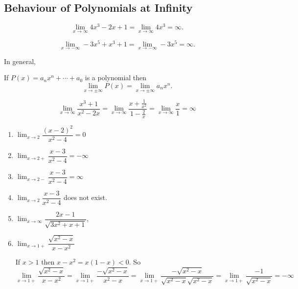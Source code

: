 \documentclass[../main.tex]{subfiles}
\begin{document}
  \subsection*{Behaviour of Polynomials at Infinity}
  \begin{example}
    \[
      \lim_{x \to \infty} 4x^3 - 2x + 1 =
      \lim_{x \to \infty} 4x^3 = \infty.
    \]

    \[
      \lim_{x \to -\infty} -3x^5 + x^3 +1 =
      \lim_{x \to -\infty} -3 x^5 = \infty.
    \]
  \end{example}
  In general,
  \begin{theorem}
    If $P(x) = a_n x^n + \cdots + a_0$ is a polynomial then
    \[
      \lim_{x \to \pm \infty} P(x) = \lim_{x \to \pm \infty} a_n x^n.
    \]
  \end{theorem}

  \begin{example}
    \[
      \lim_{x \to \infty} \frac{x^3+1}{x^2-2x} =
      \lim_{x \to \infty} \frac{x+\frac{1}{x^2}}{1-\frac{2}{x}} = \lim_{x \to \infty} \frac{x}{1} = \infty
    \]
  \end{example}

  \begin{example}
    \begin{enumerate}
      \item $\lim_{x \to 2} \dfrac{(x-2)^2}{x^2-4} = 0$
      \item $\lim_{x \to 2+} \dfrac{x-3}{x^2-4} = -\infty$
      \item $\lim_{x \to 2-} \dfrac{x-3}{x^2-4} = \infty$
      \item $\lim_{x \to 2} \dfrac{x-3}{x^2-4}$ does not exist.
      \item $\lim_{x \to \infty} \dfrac{2x-1}{\sqrt{3x^2+x+1}}$,
      \item $\lim_{x \to 1+} \dfrac{\sqrt{x^2-x}}{x-x^2}$
      \begin{solution}
        If $x>1$ then $x-x^2 = x(1-x) < 0$. So
        \[
          \lim_{x \to 1+} \dfrac{\sqrt{x^2-x}}{x-x^2} =
          \lim_{x \to 1+} \dfrac{-\sqrt{x^2-x}}{x^2-x} =
          \lim_{x \to 1+} \dfrac{-\sqrt{x^2-x}}{\sqrt{x^2-x} \sqrt{x^2-x}} =
          \lim_{x \to 1+} \dfrac{-1}{\sqrt{x^2-x}} = -\infty
        \]
      \end{solution}
    \end{enumerate}
  \end{example}
\end{document}
